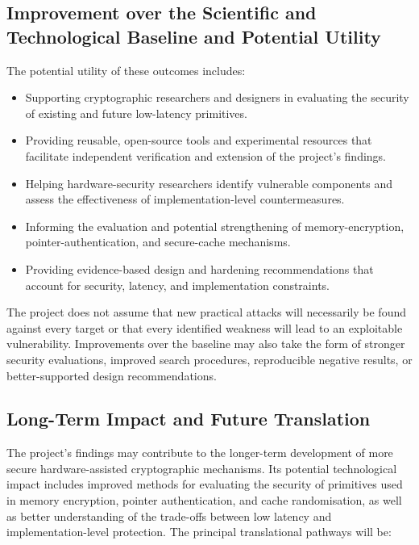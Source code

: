 \subsection{Improvement over the Scientific and Technological Baseline and Potential Utility}

The potential utility of these outcomes includes:
\begin{itemize}
    \item Supporting cryptographic researchers and designers in evaluating the security of existing and future low-latency primitives.

    \item Providing reusable, open-source tools and experimental resources that facilitate independent verification and extension of the project's findings.

    \item Helping hardware-security researchers identify vulnerable components and assess the effectiveness of implementation-level countermeasures.

    \item Informing the evaluation and potential strengthening of memory-encryption, pointer-authentication, and secure-cache mechanisms.

    \item Providing evidence-based design and hardening recommendations that account for security, latency, and implementation constraints.
\end{itemize}

The project does not assume that new practical attacks will necessarily be found against every target or that every identified weakness will lead to an exploitable vulnerability.
Improvements over the baseline may also take the form of stronger security evaluations, improved search procedures, reproducible negative results, or better-supported design recommendations.

\subsection{Long-Term Impact and Future Translation}

The project's findings may contribute to the longer-term development of more secure hardware-assisted cryptographic mechanisms.
Its potential technological impact includes improved methods for evaluating the security of primitives used in memory encryption, pointer authentication, and
cache randomisation, as well as better understanding of the trade-offs between low latency and implementation-level protection. The principal translational pathways will be:

